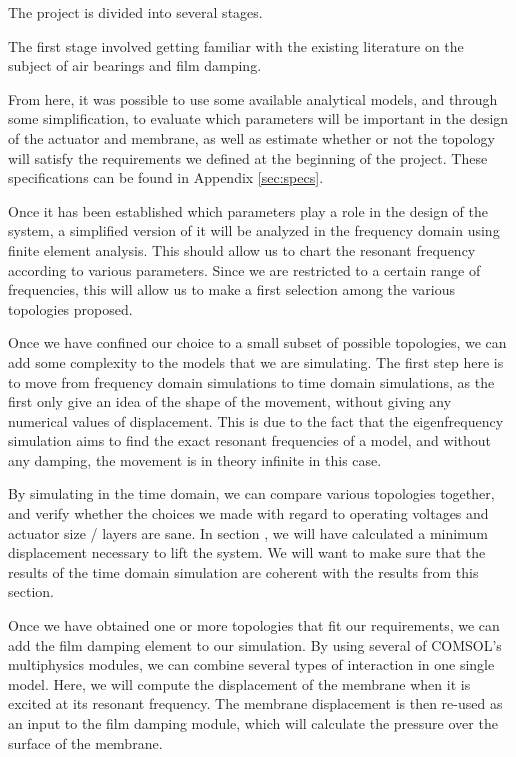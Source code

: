 The project is divided into several stages.

The first stage involved getting familiar with the existing literature on the
subject of air bearings and film damping.

From here, it was possible to use some available analytical models, and through
some simplification, to evaluate which parameters will be important in the
design of the actuator and membrane, as well as estimate whether or not the
topology will satisfy the requirements we defined at the beginning of the
project. These specifications can be found in Appendix \ref{sec:specs}.

Once it has been established which parameters play a role in the design of the
system, a simplified version of it will be analyzed in the frequency domain
using finite element analysis. This should allow us to chart the resonant
frequency according to various parameters. Since we are restricted to a certain
range of frequencies, this will allow us to make a first selection among the
various topologies proposed.

Once we have confined our choice to a small subset of possible topologies, we
can add some complexity to the models that we are simulating. The first step
here is to move from frequency domain simulations to time domain simulations, as
the first only give an idea of the shape of the movement, without giving any
numerical values of displacement. This is due to the fact that the
eigenfrequency simulation aims to find the exact resonant frequencies of a
model, and without any damping, the movement is in theory infinite in this case.

By simulating in the time domain, we can compare various topologies together,
and verify whether the choices we made with regard to operating voltages and
actuator size / layers are sane. In section  , we will have
calculated a minimum displacement necessary to lift the system.  We will want to
make sure that the results of the time domain simulation are coherent with the
results from this section.

Once we have obtained one or more topologies that fit our requirements, we can
add the film damping element to our simulation. By using several of COMSOL's
multiphysics modules, we can combine several types of interaction in one single
model. Here, we will compute the displacement of the membrane when it is excited
at its resonant frequency. The membrane displacement is then re-used as an input
to the film damping module, which will calculate the pressure over the surface
of the membrane.

